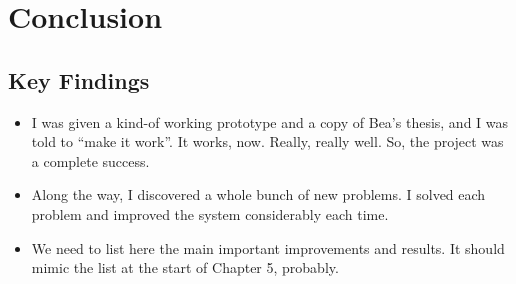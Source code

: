 \chapter{Conclusion}\label{ch:conclusion}



\section{Key Findings}

\begin{itemize}
\item I was given a kind-of working prototype and a copy of Bea's thesis, and I was told to ``make it work''.  It works, now.  Really, really well.  So, the project was a complete success.
\item Along the way, I discovered a whole bunch of new problems.  I solved each problem and improved the system considerably each time.
\item We need to list here the main important improvements and results.  It should mimic the list at the start of Chapter 5, probably.
\end{itemize}

